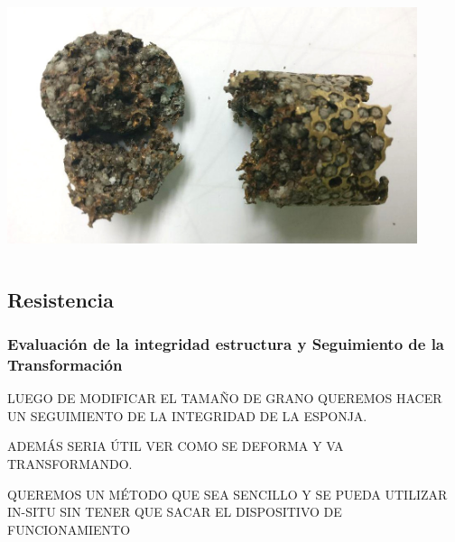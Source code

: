 \documentclass[usenames,dvipsnames]{beamer}
\begin{document}
\begin{frame}
\begin{columns}
\includegraphics[width=0.9\textwidth]{img/tamgrano/EspRota.jpg}

\end{columns}
\end{frame}


\subsection{Resistencia}


\begin{frame}
\frametitle{Evaluación de la integridad estructura y Seguimiento de la Transformación}

LUEGO DE MODIFICAR EL TAMAÑO DE GRANO QUEREMOS HACER UN SEGUIMIENTO DE LA INTEGRIDAD DE LA ESPONJA.

ADEMÁS SERIA ÚTIL VER COMO SE DEFORMA Y VA TRANSFORMANDO.

QUEREMOS UN MÉTODO QUE SEA SENCILLO Y SE PUEDA UTILIZAR IN-SITU SIN TENER QUE SACAR EL DISPOSITIVO DE FUNCIONAMIENTO 


\end{frame}

\end{document}

